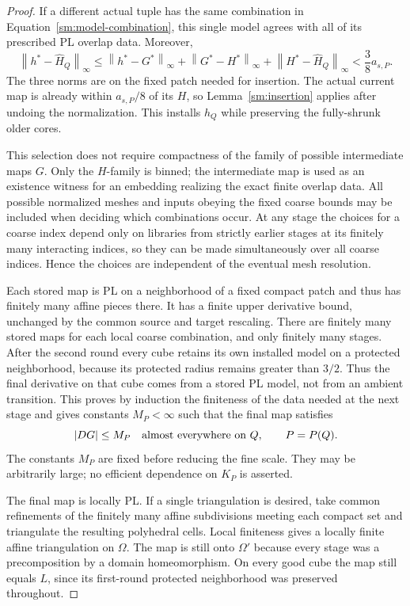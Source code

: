 \documentclass[11pt]{article}
\numberwithin{equation}{section}
\theoremstyle{definition}
\theoremstyle{remark}
\newcommand{\norm}[1]{\left\lVert #1\right\rVert}
\begin{document}
\begin{proof}
If a different actual tuple has the same
combination in Equation~\eqref{sm:model-combination}, this
single model agrees with all of its prescribed
PL overlap data.  Moreover,
\begin{equation}
 \label{sm:reuse-error}
 \norm{h^*-\widehat H_Q}_{\infty}
 \le \norm{h^*-G^*}_{\infty}
     +\norm{G^*-H^*}_{\infty}
     +\norm{H^*-\widehat H_Q}_{\infty}
 <\frac38 a_{s,P}.
\end{equation}
The three norms are on the fixed patch needed
for insertion.  The actual current map is
already within $a_{s,P}/8$ of its $H$, so
Lemma~\ref{sm:insertion} applies after undoing
the normalization.  This installs $h_Q$ while
preserving the fully-shrunk older cores.

This selection does not require compactness of
the family of possible intermediate maps $G$.
Only the $H$-family is binned; the intermediate
map is used as an existence witness for an
embedding realizing the exact finite overlap
data.  All possible normalized meshes and
inputs obeying the fixed coarse bounds may
be included when deciding which combinations
occur.  At any stage the choices for a coarse
index depend only on libraries from strictly
earlier stages at its finitely many interacting
indices, so they can be made simultaneously
over all coarse indices.  Hence the choices are independent of
the eventual mesh resolution.

Each stored map is PL on a neighborhood of a
fixed compact patch and thus has finitely many
affine pieces there.  It has a finite upper
derivative bound, unchanged by the common source and target
rescaling.  There are finitely many
stored maps for each local coarse combination,
and only finitely many stages.  After the second round every cube
retains its own installed model on a protected neighborhood,
because its protected radius remains greater than $3/2$.
Thus the final derivative on that cube comes from a stored PL
model, not from an ambient transition.  This proves by induction
the finiteness of the data needed at the next stage and gives
constants $M_P<\infty$ such that the final map satisfies
\begin{equation}
 \label{sm:model-derivative-bound}
 |DG|\le M_P\quad\hbox{almost everywhere on }Q,
 \qquad P=P(Q).
\end{equation}
The constants $M_P$ are fixed before reducing
the fine scale.  They may be arbitrarily large;
no efficient dependence on $K_P$ is asserted.

The final map is locally PL.  If a single triangulation is
desired, take common refinements of the
finitely many affine subdivisions meeting
each compact set and triangulate the resulting
polyhedral cells.  Local finiteness gives a
locally finite affine triangulation on
$\Omega$.  The map is still onto $\Omega'$
because every stage was a precomposition by
a domain homeomorphism.  On every good cube
the map still equals $L$, since its first-round
protected neighborhood was preserved throughout.


\end{proof}
\end{document}
